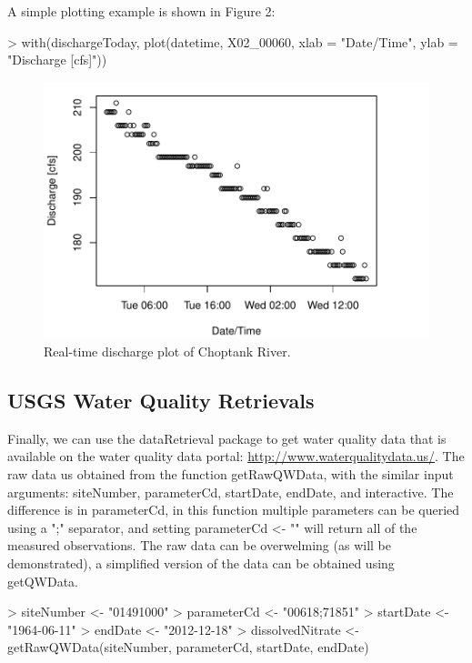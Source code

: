 \documentclass[a4paper,11pt]{article}
\begin{document}
A simple plotting example is shown in Figure 2:
\begin{Schunk}
\begin{Sinput}
> with(dischargeToday, plot(datetime, X02_00060, xlab = "Date/Time", 
     ylab = "Discharge [cfs]"))
\end{Sinput}
\end{Schunk}
\newpage

\begin{figure}
\begin{center}
\includegraphics{dataRetrieval-fig2}
\end{center}
\caption{Real-time discharge plot of Choptank River.}
\end{figure}


\subsection{USGS Water Quality Retrievals}
Finally, we can use the dataRetrieval package to get water quality data that is available on the water quality data portal: \url{http://www.waterqualitydata.us/}. The raw data us obtained from the function  getRawQWData, with the similar input arguments: siteNumber, parameterCd, startDate, endDate, and interactive. The difference is in parameterCd, in this function multiple parameters can be queried using a ";" separator, and setting parameterCd <- "" will return all of the measured observations. The raw data can be overwelming (as will be demonstrated), a simplified version of the data can be obtained using getQWData.


\begin{Schunk}
\begin{Sinput}
> siteNumber <- "01491000"
> parameterCd <- "00618;71851"
> startDate <- "1964-06-11"
> endDate <- "2012-12-18"
> dissolvedNitrate <- getRawQWData(siteNumber, parameterCd, startDate, 
     endDate)
\end{Sinput}
\end{Schunk}
\end{document}
